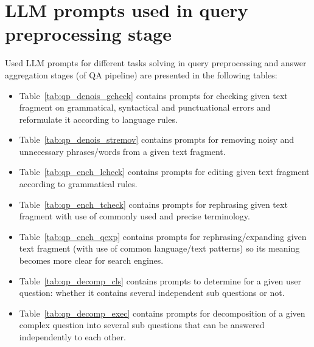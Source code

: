 \onecolumn
\appendices

\section{LLM prompts used in query preprocessing stage}
\label{app:query_preproc_and_aggr_prompts}

Used LLM prompts for different tasks solving in query preprocessing and answer aggregation stages (of QA pipeline) are presented in the following tables:
\begin{itemize}
    \item Table~\ref{tab:qp_denois_gcheck} contains prompts for checking given text fragment on grammatical, syntactical and punctuational errors and reformulate it according to language rules.
    \item Table~\ref{tab:qp_denois_stremov} contains prompts for removing noisy and unnecessary phrases/words from a given text fragment.
    \item Table~\ref{tab:qp_ench_lcheck} contains prompts for editing given text fragment according to grammatical rules.
    \item Table~\ref{tab:qp_ench_tcheck} contains prompts for rephrasing given text fragment with use of commonly used and precise terminology.
    \item Table~\ref{tab:qp_ench_qexp} contains prompts for rephrasing/expanding given text fragment (with use of common language/text patterns) so its meaning becomes more clear for search engines.
    \item Table~\ref{tab:qp_decomp_cls} contains prompts to determine for a given user question: whether it contains several independent sub questions or not.
    \item Table~\ref{tab:qp_decomp_exec} contains prompts for decomposition of a given complex question into several sub questions that can be answered independently to each other.
\end{itemize}
    
